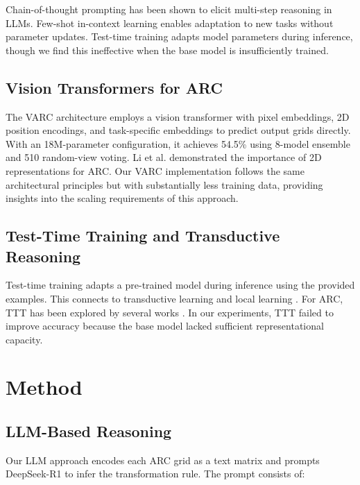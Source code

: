 \documentclass{article}
\begin{document}
Chain-of-thought prompting \cite{wei2022chain} has been shown to elicit multi-step reasoning in LLMs. Few-shot in-context learning \cite{brown2020language} enables adaptation to new tasks without parameter updates. Test-time training \cite{sun2020test,akyurek2025surprising} adapts model parameters during inference, though we find this ineffective when the base model is insufficiently trained.

\subsection{Vision Transformers for ARC}

The VARC architecture \cite{arxiv2511.14761} employs a vision transformer with pixel embeddings, 2D position encodings, and task-specific embeddings to predict output grids directly. With an 18M-parameter configuration, it achieves 54.5\% using 8-model ensemble and 510 random-view voting. Li et al. \cite{li2024tackling} demonstrated the importance of 2D representations for ARC. Our VARC implementation follows the same architectural principles but with substantially less training data, providing insights into the scaling requirements of this approach.

\subsection{Test-Time Training and Transductive Reasoning}

Test-time training \cite{sun2020test,akyurek2025surprising} adapts a pre-trained model during inference using the provided examples. This connects to transductive learning \cite{joachims1999transductive} and local learning \cite{bottou1992local}. For ARC, TTT has been explored by several works \cite{arxiv2511.14761,li2025combining}. In our experiments, TTT failed to improve accuracy because the base model lacked sufficient representational capacity.

\section{Method}

\subsection{LLM-Based Reasoning}

Our LLM approach encodes each ARC grid as a text matrix and prompts DeepSeek-R1 to infer the transformation rule. The prompt consists of:
\end{document}
